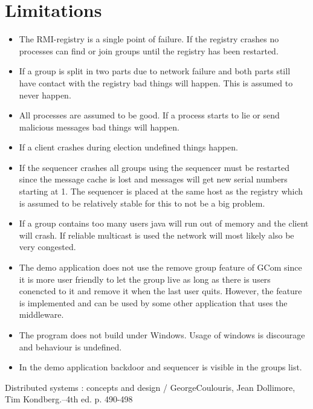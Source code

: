 \documentclass[english]{article}
\begin{document}
\section{Limitations}
\begin{itemize}
\item The RMI-registry is a single point of failure. If the registry crashes no processes can find or join groups until the registry has been restarted.

\item If a group is split in two parts due to network failure and both parts still have contact with the registry bad things will happen. This is assumed to never happen.

\item All processes are assumed to be good. If a process starts to lie or send malicious messages bad things will happen.

\item If a client crashes during election undefined things happen.

\item If the sequencer crashes all groups using the sequencer must be restarted since the message cache is lost and messages will get new serial numbers starting at 1. The sequencer is placed at the same host as the registry which is assumed to be relatively stable for this to not be a big problem.

\item If a group contains too many users java will run out of memory and the client will crash. If reliable multicast is used the network will most likely also be very congested.

\item The demo application does not use the remove group feature of GCom since it is more user friendly to let the group live as long as there is users conencted to it and remove it when the last user quits. However, the feature is implemented and can be used by some other application that uses the middleware.

\item The program does not build under Windows. Usage of windows is discourage and behaviour is undefined.

\item In the demo application backdoor and sequencer is visible in the groups list.

\end{itemize}

\begin{thebibliography}{5}
 Distributed systems : concepts and design / GeorgeCoulouris, Jean Dollimore, Tim Kondberg.--4th ed. p. 490-498

\end{thebibliography}
\end{document}
